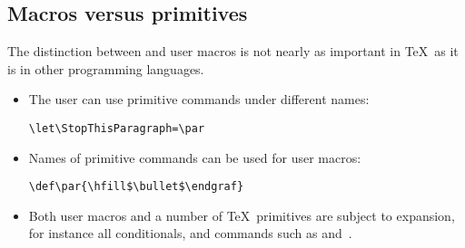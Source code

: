 \subsection{Macros versus primitives}

%     
The distinction between  and user macros is not
nearly as important in \TeX\ as it is in other programming
languages.
\begin{itemize}
\item The user can use primitive commands under different names:
     
\begin{verbatim}
\let\StopThisParagraph=\par
\end{verbatim}
\item Names of primitive commands can be used for
      user macros:
\begin{verbatim}
\def\par{\hfill$\bullet$\endgraf}
\end{verbatim}
\item Both user macros and a number of \TeX\ primitives
      are subject to expansion, for instance all conditionals,
      and commands such as  and~.
\end{itemize}

